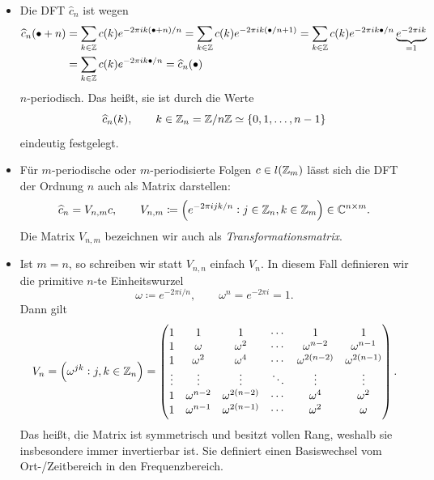 \begin{remark}\leavevmode
\begin{itemize}
\item Die DFT $ \widehat{c}_{n} $ ist wegen
  \begin{align*}
      \widehat{c}_{n}(\bullet + n)
   &= \sum_{k \in \mathbb{Z}} c(k) e^{-2\pi ik(\bullet + n) / n}
    = \sum_{k \in \mathbb{Z}} c(k) e^{-2\pi ik(\bullet / n + 1)}
    = \sum_{k \in \mathbb{Z}} c(k) e^{-2\pi ik\bullet / n} \underbrace{e^{-2\pi ik}}_{=1} \\
   &= \sum_{k \in \mathbb{Z}} c(k) e^{-2\pi ik\bullet / n} = \widehat{c}_{n}(\bullet)
  \end{align*}
  $ n $-periodisch. Das heißt, sie ist durch die Werte
  \[
    \widehat{c}_{n}(k), \qquad k \in \mathbb{Z}_{n} = \mathbb{Z} / n\mathbb{Z} \simeq \{0, 1, \ldots, n - 1\}
  \]
  eindeutig festgelegt.
\item Für $ m $-periodische oder $ m $-periodisierte Folgen $ c \in l(\mathbb{Z}_{m}) $ lässt sich die DFT 
  der Ordnung $ n $ auch als Matrix darstellen:
  \[
    \widehat{c}_{n} = V_{n,m}c, \qquad
    V_{n,m} \coloneq \left( e^{-2\pi i j k / n} : j \in \mathbb{Z}_{n}, k \in \mathbb{Z}_{m} \right) 
      \in \mathbb{C}^{n \times m}.
  \]
  Die Matrix $ V_{n,m} $ bezeichnen wir auch als \emph{Transformationsmatrix}.
\item Ist $ m = n $, so schreiben wir statt $ V_{n,n} $ einfach $ V_{n} $. In diesem Fall definieren
  wir die primitive $ n $-te Einheitswurzel
  \[
    \omega \coloneq e^{-2\pi i / n}, \qquad \omega^{n} = e^{-2\pi i} = 1.
  \]
  Dann gilt
  \[
      V_{n} 
    = \left( \omega^{jk} : j,k \in \mathbb{Z}_{n} \right)
    = \begin{pmatrix}
        1 		 & 1 						 	& 1 				 & \cdots & 1 & 1 \\
        1 		 & \omega				  & \omega^{2} & \cdots & \omega^{n - 2} & \omega^{n - 1} \\
        1 		 & \omega^{2} 		& \omega^{4} & \cdots & \omega^{2(n - 2)} & \omega^{2(n - 1)} \\
        \vdots & \vdots 				& \vdots & \ddots 	& \vdots & \vdots \\
        1 		 & \omega^{n - 2} & \omega^{2(n - 2)} & \cdots & \omega^{4} & \omega^{2} \\
        1 		 & \omega^{n - 1} & \omega^{2(n - 1)} 		& \cdots & \omega^{2} & \omega
      \end{pmatrix}.
  \]
  Das heißt, die Matrix ist symmetrisch und besitzt vollen Rang, weshalb sie insbesondere immer 
  invertierbar ist. Sie definiert einen Basiswechsel vom Ort-/Zeitbereich in den Frequenzbereich.
\end{itemize}
\end{remark}

